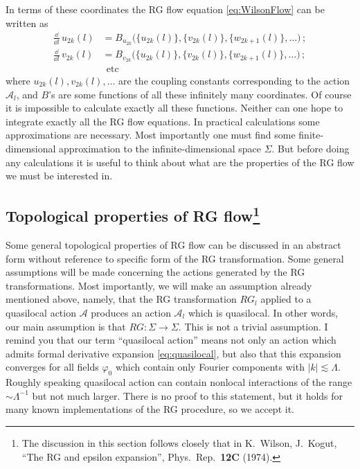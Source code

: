 In terms of these coordinates the RG flow equation \eqref{eq:WilsonFlow} can be
written as
\begin{equation}\label{eq:Bfunctions}
\begin{aligned}
\frac{\dd}{\dd l}\,u_{2k}(l)&=B_{u_{2k}}\bigl(\{u_{2k}(l)\},\{v_{2k}(l)\},\{w_{2k+1}(l)\},\dots\bigr)\,;\\
\frac{\dd}{\dd l}\,v_{2k}(l)&=B_{v_{2k}}\bigl(\{u_{2k}(l)\},\{v_{2k}(l)\},\{w_{2k+1}(l)\},\dots\bigr)\,;\\
&\ \ \text{etc}
\end{aligned}
\end{equation}
where $u_{2k}(l),v_{2k}(l),\dots$ are the coupling constants corresponding to the
action $\mathcal A_l$, and $B$'s are some functions of all these infinitely many
coordinates. Of course it is impossible to calculate exactly all these functions.
Neither can one hope to integrate exactly all the RG flow equations. In practical
calculations some approximations are necessary. Most importantly one must find
some finite-dimensional approximation to the infinite-dimensional space $\Sigma$.
But before doing any calculations it is useful to think about what are the
properties of the RG flow we must be interested in.

\subsection*{Topological properties of RG flow\protect\footnote{The discussion in
this section follows closely that in K.~Wilson, J.~Kogut, ``The RG and epsilon
expansion'', Phys.\ Rep.\ \textbf{12C} (1974).}}

Some general topological properties of RG flow can be discussed in an abstract
form without reference to specific form of the RG transformation. Some general
assumptions will be made concerning the actions generated by the RG
transformations. Most importantly, we will make an assumption already mentioned
above, namely, that the RG transformation $RG_l$ applied to a quasilocal action
$\mathcal A$ produces an action $\mathcal A_l$ which is quasilocal. In other
words, our main assumption is that $RG:\Sigma\to\Sigma$. This is not a trivial
assumption. I remind you that our term ``quasilocal action'' means not only an
action which admits formal derivative expansion \eqref{eq:quasilocal}, but also
that this expansion converges for all fields $\varphi_0$ which contain only
Fourier components with $|k|\lesssim\Lambda$. Roughly speaking quasilocal action
can contain nonlocal interactions of the range $\sim\Lambda^{-1}$ but not much
larger. There is no proof to this statement, but it holds for many known
implementations of the RG procedure, so we accept it.

